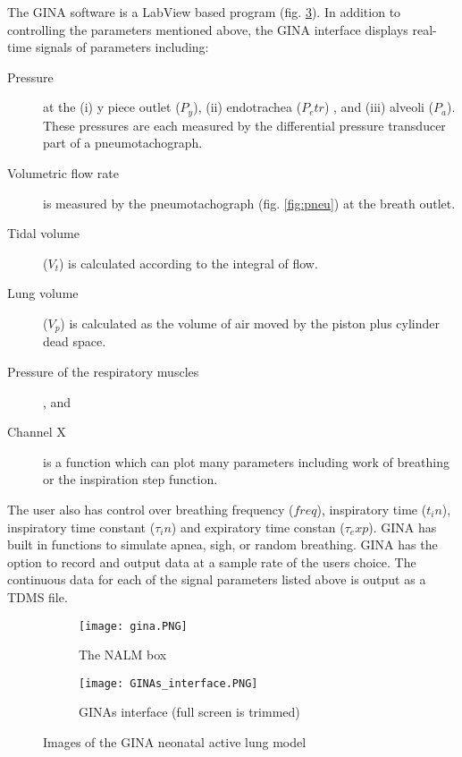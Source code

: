\documentclass[12pt, openany, oneside]{book}
\begin{document}
The GINA software is a LabView based program (fig. \ref{fig:images}). In addition to controlling the parameters mentioned above, the GINA interface displays real-time signals of parameters including: 
\begin{description}
\item [Pressure] at the (i) y piece outlet ($P_y$), (ii) endotrachea ($P_etr$) , and (iii) alveoli ($P_a$). These pressures are each measured by the differential pressure transducer part of a pneumotachograph.
\item [Volumetric flow rate] is measured by the pneumotachograph (fig. \ref{fig:pneu})  at the breath outlet.
\item [Tidal volume] ($V_t$) is calculated according to the integral of flow.
\item [Lung volume] ($V_p$) is calculated as the volume of air moved by the piston plus cylinder dead space.
\item [Pressure of the respiratory muscles], and
\item [Channel X] is a function which can plot many parameters including work of breathing or the inspiration step function.
\end{description}

The user also has control over breathing frequency ($freq$), inspiratory time ($t_in$), inspiratory time constant ($\tau_in$) and expiratory time constan ($\tau_exp$). GINA has built in functions to simulate apnea, sigh, or random breathing. GINA has the option to record and output data at a sample rate of the users choice. The continuous data for each of the signal parameters listed above is output as a TDMS file.

\begin{figure}
		
	\begin{subfigure}{.3\textwidth}
	\centering	
	\texttt{[image: gina.PNG]}	
		\caption[NALM box]{The NALM box} 
		\label{fig:nalm}	
	\end{subfigure}
	
	\begin{subfigure}{.9\textwidth}
	\centering	
		\texttt{[image: GINAs\_interface.PNG]}	
		\caption{GINAs interface (full screen is trimmed)}
		\label{fig:gina}	
	\end{subfigure}
	\caption{Images of the GINA neonatal active lung model}
	\label{fig:images}
\end{figure}	
	
\end{document}

